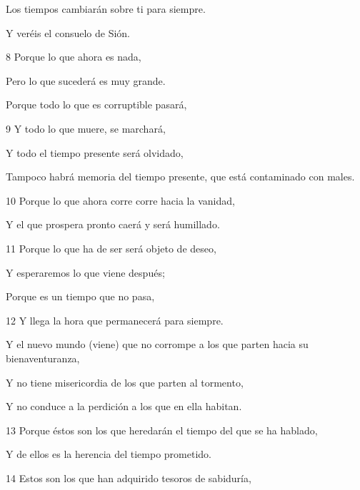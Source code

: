 \par Los tiempos cambiarán sobre ti para siempre.

\par Y veréis el consuelo de Sión.

\par 8 Porque lo que ahora es nada,

\par Pero lo que sucederá es muy grande.

\par Porque todo lo que es corruptible pasará,

\par 9 Y todo lo que muere, se marchará,

\par Y todo el tiempo presente será olvidado,

\par Tampoco habrá memoria del tiempo presente, que está contaminado con males.

\par 10 Porque lo que ahora corre corre hacia la vanidad,

\par Y el que prospera pronto caerá y será humillado.

\par 11 Porque lo que ha de ser será objeto de deseo,

\par Y esperaremos lo que viene después;

\par Porque es un tiempo que no pasa,

\par 12 Y llega la hora que permanecerá para siempre.

\par Y el nuevo mundo (viene) que no corrompe a los que parten hacia su bienaventuranza,

\par Y no tiene misericordia de los que parten al tormento,

\par Y no conduce a la perdición a los que en ella habitan.

\par 13 Porque éstos son los que heredarán el tiempo del que se ha hablado,

\par Y de ellos es la herencia del tiempo prometido.

\par 14 Estos son los que han adquirido tesoros de sabiduría,

